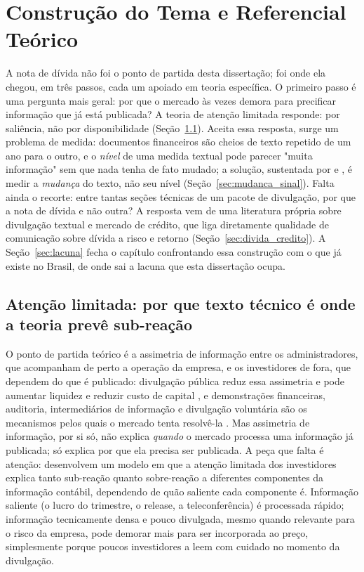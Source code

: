 \documentclass[a4paper,12pt]{report}
\begin{document}
\chapter{Construção do Tema e Referencial Teórico}
\label{ch:referencial}

A nota de dívida não foi o ponto de partida desta dissertação; foi onde ela chegou, em três passos, cada um apoiado em teoria específica. O primeiro passo é uma pergunta mais geral: por que o mercado às vezes demora para precificar informação que já está publicada? A teoria de atenção limitada responde: por saliência, não por disponibilidade (Seção~\ref{sec:atencao}). Aceita essa resposta, surge um problema de medida: documentos financeiros são cheios de texto repetido de um ano para o outro, e o \emph{nível} de uma medida textual pode parecer "muita informação" sem que nada tenha de fato mudado; a solução, sustentada por  e , é medir a \emph{mudança} do texto, não seu nível (Seção~\ref{sec:mudanca_sinal}). Falta ainda o recorte: entre tantas seções técnicas de um pacote de divulgação, por que a nota de dívida e não outra? A resposta vem de uma literatura própria sobre divulgação textual e mercado de crédito, que liga diretamente qualidade de comunicação sobre dívida a risco e retorno (Seção~\ref{sec:divida_credito}). A Seção~\ref{sec:lacuna} fecha o capítulo confrontando essa construção com o que já existe no Brasil, de onde sai a lacuna que esta dissertação ocupa.

\section{Atenção limitada: por que texto técnico é onde a teoria prevê sub-reação}
\label{sec:atencao}

O ponto de partida teórico é a assimetria de informação entre os administradores, que acompanham de perto a operação da empresa, e os investidores de fora, que dependem do que é publicado: divulgação pública reduz essa assimetria e pode aumentar liquidez e reduzir custo de capital \cite{diamond1991}, e demonstrações financeiras, auditoria, intermediários de informação e divulgação voluntária são os mecanismos pelos quais o mercado tenta resolvê-la \cite{healy2001}. Mas assimetria de informação, por si só, não explica \emph{quando} o mercado processa uma informação já publicada; só explica por que ela precisa ser publicada. A peça que falta é atenção:  desenvolvem um modelo em que a atenção limitada dos investidores explica tanto sub-reação quanto sobre-reação a diferentes componentes da informação contábil, dependendo de quão saliente cada componente é. Informação saliente (o lucro do trimestre, o release, a teleconferência) é processada rápido; informação tecnicamente densa e pouco divulgada, mesmo quando relevante para o risco da empresa, pode demorar mais para ser incorporada ao preço, simplesmente porque poucos investidores a leem com cuidado no momento da divulgação.
\end{document}
